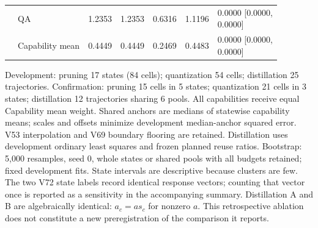 \begin{table}[!htbp]
\begin{tabular*}{\textwidth}{@{\extracolsep{\fill}}llrrrrl@{}}
 & QA & 1.2353 & 1.2353 & 0.6316 & 1.1196 & \shortstack[l]{0.0000 [0.0000,\\0.0000]} \\
 & Capability mean & 0.4449 & 0.4449 & 0.2469 & 0.4483 & \shortstack[l]{0.0000 [0.0000,\\0.0000]} \\
\bottomrule
\end{tabular*}
\par\smallskip
\begin{minipage}{0.99\linewidth}\footnotesize Development: pruning 17 states (84 cells); quantization 54 cells; distillation 25 trajectories. Confirmation: pruning 15 cells in 5 states; quantization 21 cells in 3 states; distillation 12 trajectories sharing 6 pools. All capabilities receive equal Capability mean weight. Shared anchors are medians of statewise capability means; scales and offsets minimize development median-anchor squared error. V53 interpolation and V69 boundary flooring are retained. Distillation uses development ordinary least squares and frozen planned reuse ratios. Bootstrap: 5,000 resamples, seed 0, whole states or shared pools with all budgets retained; fixed development fits. State intervals are descriptive because clusters are few. The two V72 state labels record identical response vectors; counting that vector once is reported as a sensitivity in the accompanying summary. Distillation A and B are algebraically identical: $a_c=a s_c$ for nonzero $a$. This retrospective ablation does not constitute a new preregistration of the comparison it reports.\end{minipage}
\end{table}
